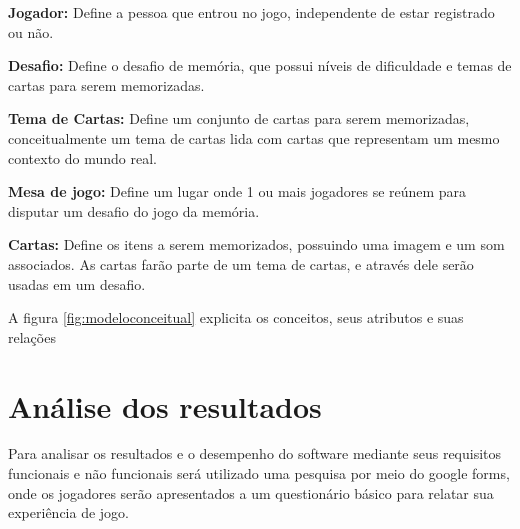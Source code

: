 \begin{alineascomponto}
  \item \textbf{Jogador:} Define a pessoa que entrou no jogo, independente de estar registrado ou não.
  \item \textbf{Desafio:} Define o desafio de memória, que possui níveis de dificuldade e temas de cartas para serem memorizadas.  
  \item \textbf{Tema de Cartas:} Define um conjunto de cartas para serem memorizadas, conceitualmente um tema de cartas lida com cartas que representam um mesmo contexto do mundo real.
  \item \textbf{Mesa de jogo:} Define um lugar onde 1 ou mais jogadores se reúnem para disputar um desafio do jogo da memória.
  \item \textbf{Cartas:} Define os itens a serem memorizados, possuindo uma imagem e um som associados. As cartas farão parte de um tema de cartas, e através dele serão usadas em um desafio. 
\end{alineascomponto}

A figura \ref{fig:modeloconceitual} explicita os conceitos, seus atributos e suas relações

\begin{figure}[h!]
  \centering
\end{figure}

\section{Análise dos resultados}

Para analisar os resultados e o desempenho do software mediante seus requisitos funcionais e não funcionais \cite{waslawick} será utilizado uma pesquisa por meio do google forms, onde os jogadores serão apresentados a um questionário básico para relatar sua experiência de jogo.

